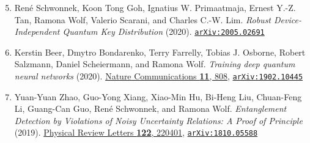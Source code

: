 \begin{enumerate}
	\setcounter{enumi}{4}
	\item René Schwonnek, Koon Tong Goh, Ignatius W. Primaatmaja, Ernest Y.-Z. Tan, Ramona Wolf, Valerio Scarani, and Charles C.-W. Lim. \emph{Robust Device-Independent Quantum Key Distribution} (2020). \href{https://arxiv.org/abs/2005.02691}{\texttt{arXiv:2005.02691}}\vspace{10pt}
	
	\item Kerstin Beer, Dmytro Bondarenko, Terry Farrelly, Tobias J. Osborne, Robert Salzmann, Daniel Scheiermann, and Ramona Wolf. \emph{Training deep quantum neural networks} (2020). \href{https://doi.org/10.1038/s41467-020-14454-2}{Nature Communications \textbf{11}, 808}, \href{https://arxiv.org/abs/1902.10445}{\texttt{arXiv:1902.10445}}\vspace{10pt}
	
	\item Yuan-Yuan Zhao, Guo-Yong Xiang, Xiao-Min Hu, Bi-Heng Liu, Chuan-Feng Li, Guang-Can Guo, René Schwonnek, and Ramona Wolf. \emph{Entanglement Detection by Violations of Noisy Uncertainty Relations: A Proof of Principle} (2019). \href{https://journals.aps.org/prl/abstract/10.1103/PhysRevLett.122.220401}{Physical Review Letters \textbf{122}, 220401}, \href{https://arxiv.org/abs/1810.05588}{\texttt{arXiv:1810.05588}}\vspace{10pt}
\end{enumerate}
%
%	
%	
